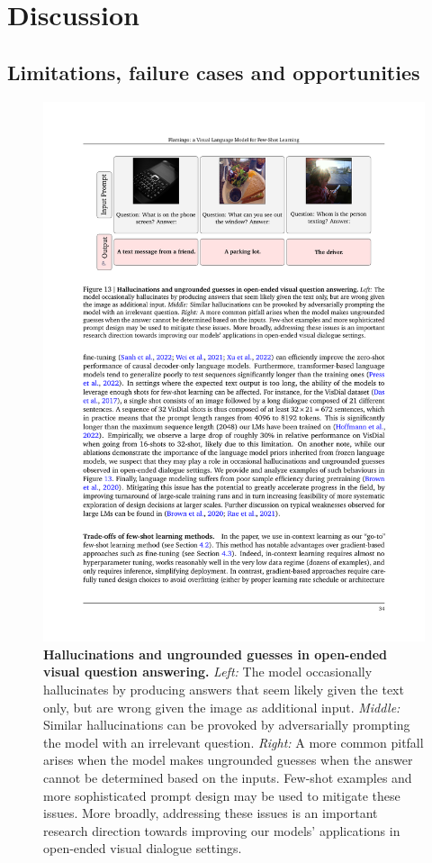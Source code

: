 \section{Discussion}
\label{app:full_discussion}
\subsection{Limitations, failure cases and opportunities}
\label{sec:limitations}

\begin{figure}
    \centering
    \includegraphics[width=\textwidth]{figures/failure_cases.pdf}
    \caption{
    \capfontsize{} \textbf{Hallucinations and ungrounded guesses in open-ended visual question answering.} %
    \textit{Left:} The model occasionally hallucinates by producing answers that seem likely given the text only, but are wrong given the image as additional input.
    \textit{Middle:}
    Similar hallucinations can be provoked by adversarially prompting the model with an irrelevant question.
    \textit{Right:}
    A more common pitfall arises when the model makes ungrounded guesses when the answer cannot be determined based on the inputs.
    Few-shot examples and more sophisticated prompt design may be used to mitigate these issues. More broadly, addressing these issues is an important research direction towards improving our models' applications in open-ended visual dialogue settings.
    }
    \label{fig:failure_examples}
\end{figure}

